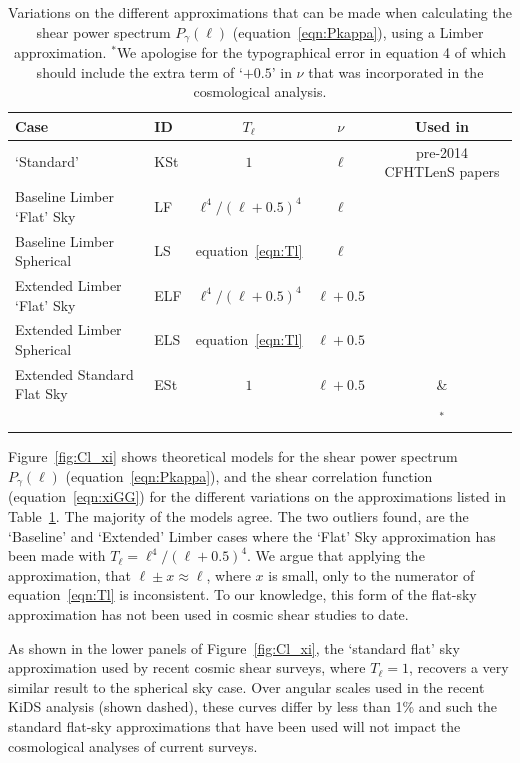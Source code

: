 \begin{table}[htb]
\label{tab:Tl_nu}
\begin{center}
\begin{tabular}{ | l | l | c | c  | c |}
\hline
Case & ID & $T_\ell$ & $\nu$ & Used in \\ \hline
\citet{kitching/etal:2016} `Standard' & KSt & $1$ & $\ell$ & pre-2014 CFHTLenS papers \\
Baseline Limber `Flat' Sky &  LF & $\ell^4 / (\ell + 0.5)^4$ & $\ell$ & \\
Baseline Limber Spherical & LS & equation~\ref{eqn:Tl} & $\ell$ & \\
Extended Limber `Flat' Sky & ELF & $\ell^4 / (\ell + 0.5)^4$ & $\ell + 0.5$ & \\
Extended Limber Spherical & ELS & equation~\ref{eqn:Tl}& $\ell + 0.5$  & \\
Extended Standard Flat Sky & ESt & $1$ & $\ell + 0.5$ & \citet{joudaki/etal:2016} \&  \\
  &  & & & \citet{hildebrandt/etal:2016}$^*$\\\hline
 \end{tabular}
 \end{center}
 \caption{Variations on the different approximations that can be made when calculating the shear power spectrum $P_\gamma(\ell)$ (equation~\ref{eqn:Pkappa}), using a Limber approximation.  $^*$We apologise for the typographical error in equation 4 of \citet{hildebrandt/etal:2016} which should include the extra term of `$+0.5$' in $\nu$ that was incorporated in the cosmological analysis.} 
 \end{table}

Figure~\ref{fig:Cl_xi} shows theoretical models for the shear power spectrum $P_\gamma(\ell)$ (equation~\ref{eqn:Pkappa}), and the shear correlation function (equation~\ref{eqn:xiGG}) for the different variations on the approximations listed in Table~\ref{tab:Tl_nu}.   The majority of the models agree.  The two outliers found, are the `Baseline' and `Extended' Limber cases where the \citet{kitching/etal:2016} `Flat' Sky approximation has been made with $T_\ell = \ell^4 / (\ell + 0.5)^4$.    We argue that applying the approximation, that $\ell \pm x \approx \ell$, where $x$ is small, only to the numerator of equation~\ref{eqn:Tl} is inconsistent.    To our knowledge, this form of the flat-sky approximation has not been used in cosmic shear studies to date.

As shown in the lower panels of Figure~\ref{fig:Cl_xi}, the `standard flat' sky approximation used by recent cosmic shear surveys, where $T_\ell = 1$, recovers a very similar result to the spherical sky case.  Over angular scales used in the recent KiDS analysis (shown dashed), these curves differ by less than 1\% and such the standard flat-sky approximations that have been used will not impact the cosmological analyses of current surveys.
 
